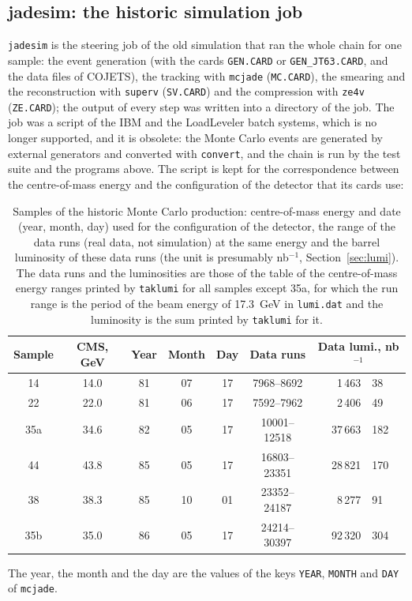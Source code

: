 \subsection{jadesim: the historic simulation job}
\texttt{jadesim} is the steering job of the old simulation that ran the whole chain for one sample: the event generation
(with the cards \texttt{GEN.CARD} or \texttt{GEN\_\allowbreak{}JT63.CARD}, and the data files of COJETS), the tracking with
\texttt{mcjade} (\texttt{MC.CARD}), the smearing and the reconstruction with \texttt{superv} (\texttt{SV.CARD}) and the
compression with \texttt{ze4v} (\texttt{ZE.CARD}); the output of every step was written into a directory of the job. The
job was a script of the IBM and the LoadLeveler batch systems, which is no longer supported, and it is obsolete:
the Monte Carlo events are generated by external generators and converted with \texttt{convert}, and the chain is run
by the test suite and the programs above. The script is kept for the correspondence between the centre-of-mass
energy and the configuration of the detector that its cards use:
\begin{table}[H]\centering
\begin{tabular}{|c|c|c|c|c|c|r@{\,$\pm$\,}l|}\hline
Sample & CMS, GeV & Year & Month & Day & Data runs & \multicolumn{2}{c|}{Data lumi., nb$^{-1}$} \\\hline\hline
14  & 14.0 & 81 & 07 & 17 &  7968--8692   & 1\,463  & 38  \\
22  & 22.0 & 81 & 06 & 17 &  7592--7962   & 2\,406  & 49  \\
35a & 34.6 & 82 & 05 & 17 & 10001--12518  & 37\,663 & 182 \\
44  & 43.8 & 85 & 05 & 17 & 16803--23351  & 28\,821 & 170 \\
38  & 38.3 & 85 & 10 & 01 & 23352--24187  & 8\,277  & 91  \\
35b & 35.0 & 86 & 05 & 17 & 24214--30397  & 92\,320 & 304 \\\hline
\end{tabular}
\caption{Samples of the historic Monte Carlo production: centre-of-mass energy and date (year, month, day) used for the configuration of the detector, the range of the data runs (real data, not simulation)
at the same energy and the barrel luminosity of these data runs (the unit is presumably nb$^{-1}$, Section~\ref{sec:lumi}). The data runs and the luminosities are those of the table of the centre-of-mass energy ranges
printed by \texttt{taklumi} for all samples except 35a, for which the run range is the period of the beam energy of 17.3~GeV in \texttt{lumi.dat} and the luminosity
is the sum printed by \texttt{taklumi} for it.}
\label{tab:mcsamples}
\end{table}
The year, the month and the day are the values of the keys \texttt{YEAR}, \texttt{MONTH} and \texttt{DAY} of
\texttt{mcjade}.

